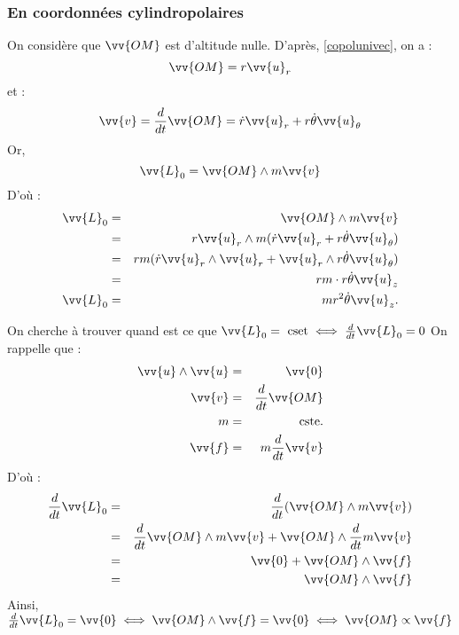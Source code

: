\subsubsection{En coordonnées cylindropolaires}

\begin{corollary}
    On considère que \(\vv{OM}\) est d'altitude nulle. D'après, \autoref{copolunivec}, on a : 
    \[
        \vv{OM} = r\vv{u}_{r}
    \]
    et : 
    \[
        \vv{v} = \frac{d}{dt}\vv{OM} = \dot{r} \vv{u}_{r} + r \dot{\theta}\vv{u}_{\theta}
    \]
    Or,
    \[
        \vv{L}_{0} = \vv{OM} \wedge m\vv{v}
    \]
    D'où : 
    \begin{eqnarray*}
    \vv{L}_0 &=& \vv{OM} \wedge m\vv{v} \\
    &=& r\vv{u}_r \wedge m(\dot{r}\vv{u}_r + r\dot{\theta}\vv{u}_\theta) \\
    &=& rm(\dot{r}\vv{u}_r \wedge \vv{u}_r +\vv{u}_r\wedge r\dot{\theta}\vv{u}_\theta) \\
    &=& rm\cdot r\dot{\theta}\vv{u}_z \\
    \vv{L}_0 &=& mr^2\dot{\theta}\vv{u}_z
.\end{eqnarray*}
\end{corollary}

\begin{corollary}\label{col:TMC}
    On cherche à trouver quand est ce que \(\vv{L}_{0} = \text{ cset} \iff \frac{d}{dt}\vv{L}_{0} = 0\) 
    On rappelle que : 
    \begin{eqnarray*}
        \vv{u} \wedge  \vv{u} &=& \vv{0} \\
        \vv{v} &=& \frac{d}{dt}\vv{OM} \\
        m &=& \text{ cste}. \\
        \vv{f} &=& m\frac{d}{dt}\vv{v} \\
    \end{eqnarray*}
    D'où : 
    \begin{eqnarray*}
        \frac{d}{dt}\vv{L}_{0} &=& \frac{d}{dt}(\vv{OM} \wedge m\vv{v}) \\
        &=& \frac{d}{dt}\vv{OM} \wedge m\vv{v} + \vv{OM} \wedge \frac{d}{dt}m\vv{v} \\
        &=& \vv{0} + \vv{OM} \wedge \vv{f} \\
        &=& \vv{OM} \wedge \vv{f}
    \end{eqnarray*}
    Ainsi, \(\frac{d}{dt}\vv{L}_{0} = \vv{0} \iff \vv{OM} \wedge \vv{f} = \vv{0} \iff \vv{OM} \propto \vv{f}\) 
\end{corollary}

